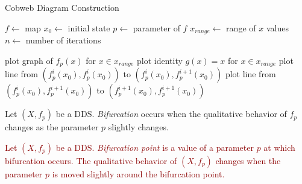 \begin{algorithm}
\caption{Cobweb Diagram Construction}\label{cobweb_alg}
\begin{algorithmic}[1]
\Statex $f \gets$ map
\Statex $x_0 \gets$ initial state
\Statex $p \gets$ parameter of $f$
\Statex $x_{range} \gets$ range of $x$ values
\Statex $n \gets$ number of iterations

\State plot graph of $f_p(x)$ for $x \in x_{range}$
\State plot identity $g(x)=x$ for $x \in x_{range}$
\State plot line from $(f_{p}^{i}(x_0), f_{p}^{i}(x_0))$ to $(f_{p}^{i}(x_0), f_{p}^{i+1}(x_0))$
\State plot line from $(f_{p}^{i}(x_0), f_{p}^{i+1}(x_0))$ to $(f_{p}^{i+1}(x_0), f_{p}^{i+1}(x_0))$
\EndFor

\end{algorithmic}
\end{algorithm}

\begin{definition}[Bifurcation]
\label{def:bifurcation}
    Let $\left( X, f_p \right)$ be a DDS.
    \emph{Bifurcation} occurs when the qualitative behavior of $f_p$ changes as the parameter $p$ slightly changes.
\end{definition}

\begin{definition}
\label{def:bifurcation_point}
    \textcolor{darkred}{
    Let $\left( X, f_p \right)$ be a DDS.
    \emph{Bifurcation point} is a value of a parameter $p$ at which bifurcation occurs.
    The qualitative behavior of $\left( X, f_{p} \right)$ changes when the parameter $p$ is moved slightly around the bifurcation point.
    }
\end{definition}

